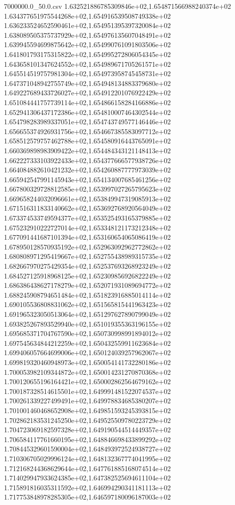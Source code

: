 \begin{filecontents*}{7000000.0_50.0.csv}
1.632521886785309846e+02,1.654871566988240374e+02
1.634377651975544268e+02,1.654916539508749338e+02
1.636233524652590461e+02,1.654951395397320084e+02
1.638089505375737929e+02,1.654976135607048491e+02
1.639945594699875642e+02,1.654990761091803506e+02
1.641801793175315822e+02,1.654995272806054345e+02
1.643658101347624552e+02,1.654989671705261571e+02
1.645514519757981304e+02,1.654973958745458731e+02
1.647371048942755749e+02,1.654948134883379680e+02
1.649227689433726027e+02,1.654912201076922429e+02
1.651084441757739114e+02,1.654866158284166886e+02
1.652941306437172386e+02,1.654810007464302544e+02
1.654798283989337051e+02,1.654743749577146446e+02
1.656655374926931756e+02,1.654667385583097712e+02
1.658512579757462788e+02,1.654580916443765091e+02
1.660369898983909422e+02,1.654484343121148413e+02
1.662227333103922433e+02,1.654377666577938726e+02
1.664084882610421232e+02,1.654260887777973039e+02
1.665942547991145943e+02,1.654134007685461256e+02
1.667800329728812585e+02,1.653997027265795623e+02
1.669658244032096661e+02,1.653849947319085913e+02
1.671516311833140662e+02,1.653692768920564049e+02
1.673374533749594377e+02,1.653525493165379885e+02
1.675232910222727014e+02,1.653348121173212348e+02
1.677091441687101394e+02,1.653160654065086419e+02
1.678950128570935192e+02,1.652963092962772862e+02
1.680808971295419667e+02,1.652755438989315735e+02
1.682667970275429354e+02,1.652537693268923249e+02
1.684527125918968125e+02,1.652309856926822249e+02
1.686386438627178279e+02,1.652071931089694772e+02
1.688245908794651484e+02,1.651823916885014114e+02
1.690105536808831062e+02,1.651565815441963423e+02
1.691965323050513064e+02,1.651297627890799049e+02
1.693825267893529940e+02,1.651019355363196155e+02
1.695685371704767590e+02,1.650730998991894012e+02
1.697545634844212259e+02,1.650432559911623684e+02
1.699406057664699006e+02,1.650124039257962067e+02
1.699819320460948973e+02,1.650054141732280186e+02
1.700053982109344872e+02,1.650014231270870368e+02
1.700120655196164421e+02,1.650002862564679162e+02
1.700187328514615501e+02,1.649991481522074537e+02
1.700261339227499491e+02,1.649978834685380207e+02
1.701001460468652908e+02,1.649851593245393815e+02
1.702862183531245250e+02,1.649525509780223729e+02
1.704723069182597328e+02,1.649190544514449357e+02
1.706584117761660195e+02,1.648846698433899292e+02
1.708445329601590004e+02,1.648493972524938727e+02
1.710306705029996124e+02,1.648132367774041995e+02
1.712168244368629644e+02,1.647761885168074514e+02
1.714029947933624385e+02,1.647382525694611104e+02
1.715891816035311592e+02,1.646994290341181113e+02
1.717753848978285305e+02,1.646597180096187003e+02

\end{filecontents*}
